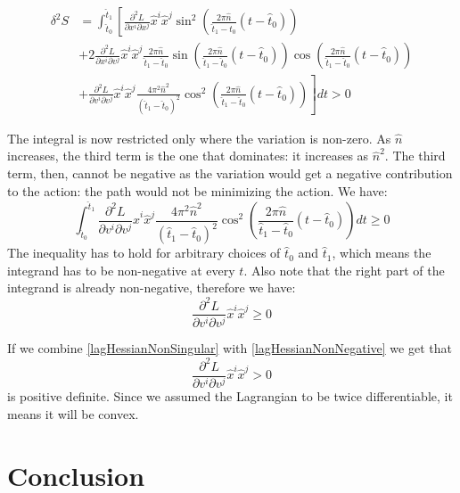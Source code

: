 \documentclass[aps,pra,10pt,floatfix,nofootinbib]{revtex4-1}
\theoremstyle{definition}
\begin{document}
\begin{align*}
\delta^2 S &= \int_{\hat{t}_0}^{\hat{t}_1} \left[ \frac{\partial^2 L}{\partial x^i\partial x^j} \hat{x}^i \hat{x}^j \sin^2\left(\frac{2\pi \hat{n}}{\hat{t}_1 - \hat{t}_0} (t-\hat{t}_0)\right) \right. \\
& + \left. 2 \frac{\partial^2 L}{\partial x^i\partial v^j} \hat{x}^i \hat{x}^j \frac{2\pi \hat{n}}{\hat{t}_1 - \hat{t}_0} \sin\left(\frac{2\pi \hat{n}}{\hat{t}_1 - \hat{t}_0} (t-\hat{t}_0)\right) \cos\left(\frac{2\pi \hat{n}}{\hat{t}_1 - \hat{t}_0} (t-\hat{t}_0)\right) \right. \\
& + \left.  \frac{\partial^2 L}{\partial v^i\partial v^j} \hat{x}^i \hat{x}^j \frac{4\pi^2 \hat{n}^2}{(\hat{t}_1 - \hat{t}_0)^2} \cos^2\left(\frac{2\pi \hat{n}}{\hat{t}_1 - \hat{t}_0} (t-\hat{t}_0)\right) \right]dt > 0
\end{align*}

The integral is now restricted only where the variation is non-zero. As $\hat{n}$ increases, the third term is the one that dominates: it increases as $\hat{n}^2$. The third term, then, cannot be negative as the variation would get a negative contribution to the action: the path would not be minimizing the action. We have:
\begin{equation}
\int_{\hat{t}_0}^{\hat{t}_1} \frac{\partial^2 L}{\partial v^i\partial v^j} \hat{x}^i \hat{x}^j \frac{4\pi^2 \hat{n}^2}{(\hat{t}_1 - \hat{t}_0)^2} \cos^2\left(\frac{2\pi \hat{n}}{\hat{t}_1 - \hat{t}_0} (t-\hat{t}_0)\right) dt \geq 0
\end{equation}
The inequality has to hold for arbitrary choices of $\hat{t}_0$ and $\hat{t}_1$, which means the integrand has to be non-negative at every $t$. Also note that the right part of the integrand is already non-negative, therefore we have:
\begin{equation}
\label{lagHessianNonNegative}
\frac{\partial^2 L}{\partial v^i\partial v^j} \hat{x}^i \hat{x}^j \geq 0
\end{equation}

If we combine \eqref{lagHessianNonSingular} with \eqref{lagHessianNonNegative} we get that
\begin{equation}
\label{lagHessianPositive}
\frac{\partial^2 L}{\partial v^i\partial v^j} \hat{x}^i \hat{x}^j > 0
\end{equation}
is positive definite. Since we assumed the Lagrangian to be twice differentiable, it means it will be convex.

\section{Conclusion}
\end{document}
